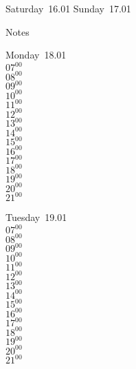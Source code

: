 \documentclass[11pt,a4paper]{book}\usepackage[]{graphicx}\usepackage[]{color}
\begin{document}
\begin{weekendbox}
  Saturday~16.01
  \tcblower
  Sunday~17.01
\end{weekendbox} %
\begin{notebox}
  Notes
\end{notebox}
\clearpage
\begin{headerbox}
\end{headerbox}
\begin{weekdaybox}
  Monday~18.01\\
  { 
  \vfill
  $07^{00}$\\
$08^{00}$\\
$09^{00}$\\
$10^{00}$\\
$11^{00}$\\
$12^{00}$\\
$13^{00}$\\
$14^{00}$\\
$15^{00}$\\
$16^{00}$\\
$17^{00}$\\
$18^{00}$\\
$19^{00}$\\
$20^{00}$\\
$21^{00}$\\
  }
\end{weekdaybox}
\begin{weekdaybox}
  Tuesday~19.01\\
  { 
  \vfill
  $07^{00}$\\
$08^{00}$\\
$09^{00}$\\
$10^{00}$\\
$11^{00}$\\
$12^{00}$\\
$13^{00}$\\
$14^{00}$\\
$15^{00}$\\
$16^{00}$\\
$17^{00}$\\
$18^{00}$\\
$19^{00}$\\
$20^{00}$\\
$21^{00}$\\
  }
\end{weekdaybox}
\end{document}
